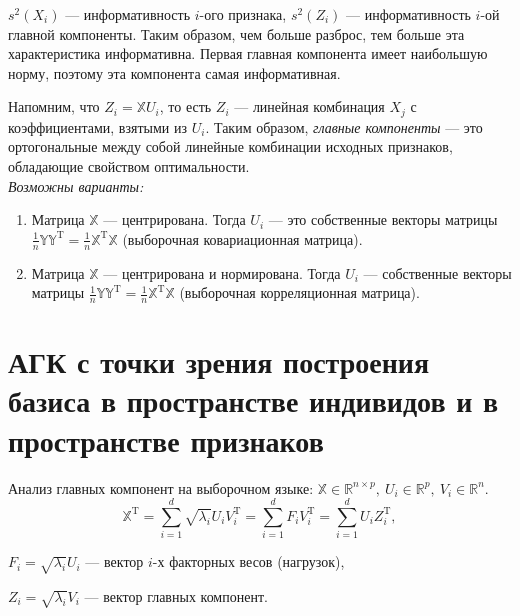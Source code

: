 \documentclass[specialist, 12pt,
subf, %
href, colorlinks=true,
substylefile = spbu.rtx,
]{disser}
\begin{document}
$s^2(X_i)$ --- информативность $i$-ого признака, $s^2(Z_i)$ --- информативность $i$-ой главной компоненты. Таким образом, чем больше разброс, тем больше эта характеристика информативна. Первая главная компонента имеет наибольшую норму, поэтому эта компонента самая информативная.

Напомним, что $Z_i=\mathbb{X}U_i$, то есть $Z_i$ --- линейная комбинация $X_j$ с коэффициентами, взятыми из $U_i$. Таким образом, \textit{главные компоненты} --- это ортогональные между собой линейные комбинации исходных признаков, обладающие свойством оптимальности.\\

\textit{Возможны варианты:}
\begin{enumerate}
	\item Матрица $\mathbb{X}$ --- центрирована. Тогда $U_i$ --- это собственные векторы матрицы $\frac{1}{n}\mathbb{Y}\mathbb{Y}^\mathrm{T} = \frac{1}{n}\mathbb{X}^\mathrm{T}\mathbb{X}$ (выборочная ковариационная матрица).
	
	\item Матрица $\mathbb{X}$ --- центрирована и нормирована. Тогда $U_i$ --- собственные векторы матрицы $\frac{1}{n}\mathbb{Y}\mathbb{Y}^\mathrm{T} = \frac{1}{n}\mathbb{X}^\mathrm{T}\mathbb{X}$ (выборочная корреляционная матрица).
\end{enumerate}

\newpage
\section{АГК с точки зрения построения базиса в пространстве индивидов и в пространстве признаков}

Анализ главных компонент на выборочном языке: $\mathbb{X}\in\mathbb{R}^{n\times p},~U_i\in\mathbb{R}^p,~V_i\in\mathbb{R}^n$.
\begin{equation*}
\mathbb{X}^\mathrm{T}=\sum\limits_{i =1}^d \sqrt{\lambda_i} U_i V_i^{\mathrm{T}} = \sum\limits_{i =1}^d F_i V_i^\mathrm{T} = \sum\limits_{i =1}^d U_i Z_i^\mathrm{T},
\end{equation*}

$F_i=\sqrt{\lambda_i} U_i$ --- вектор $i$-х факторных весов (нагрузок),

$Z_i=\sqrt{\lambda_i} V_i$ --- вектор главных компонент.
\end{document}
